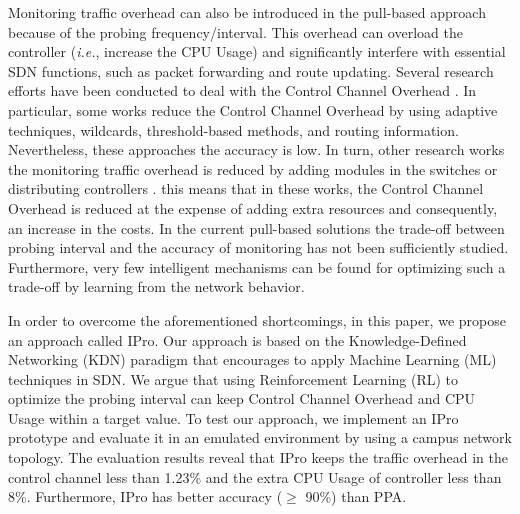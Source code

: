 Monitoring traffic overhead can also be introduced in the  pull-based approach because of the probing frequency/interval. This overhead can overload the controller (\textit{i.e.}, increase the CPU Usage) and significantly interfere with essential SDN functions, such as packet forwarding and route updating. Several research efforts have been conducted to deal with the Control Channel Overhead \cite{chowdhury_2014:payless, raumer_2014:monsamp, van_2014:OpenNetMon, tahaei_2017:multi-objective, Tootoonchian_2010:opentm, Sun_2015:HONE, phan2017:sdn_mon, liao_2018:LLDP-looping, jose_2011:online_measurement, tangari_2017:decentralized_monitoring, Tangari_2018:adaptive_decentralized_monitoring, phan2017:adaptive_sdn_mon, tahaei_2018:cost_effective}. In particular, some works \cite{chowdhury_2014:payless, raumer_2014:monsamp, van_2014:OpenNetMon, tahaei_2017:multi-objective, Tootoonchian_2010:opentm} reduce the Control Channel Overhead by using adaptive techniques, wildcards, threshold-based methods, and routing information. Nevertheless, these approaches the accuracy is low. In turn, other research works the monitoring traffic overhead is reduced by adding modules in the switches \cite{Sun_2015:HONE, phan2017:sdn_mon, liao_2018:LLDP-looping} or distributing controllers \cite{jose_2011:online_measurement, tangari_2017:decentralized_monitoring, Tangari_2018:adaptive_decentralized_monitoring, phan2017:adaptive_sdn_mon, tahaei_2018:cost_effective}. 
this means that in these works, the Control Channel Overhead is reduced at the expense of adding extra resources and consequently, an increase in the costs. In the current pull-based solutions the trade-off between probing interval and the accuracy of monitoring has not been sufficiently studied. Furthermore, very few intelligent mechanisms can be found for optimizing such a trade-off by learning from the network behavior.

In order to overcome the aforementioned shortcomings, in this paper, we propose an approach called IPro. Our approach is based on the Knowledge-Defined Networking (KDN) \cite{mestres_2017:KDN} paradigm that encourages to apply Machine Learning (ML) techniques in SDN. We argue that using Reinforcement Learning (RL) to optimize the probing interval can keep Control Channel Overhead and CPU Usage within a target value. To test our approach, we implement an IPro prototype and evaluate it in an emulated environment by using a campus network topology.  The evaluation results reveal that IPro keeps the traffic overhead in the control channel less than 1.23\% and the extra CPU Usage of controller less than 8\%. Furthermore, IPro has better accuracy ($\geq$ 90\%) than PPA.

